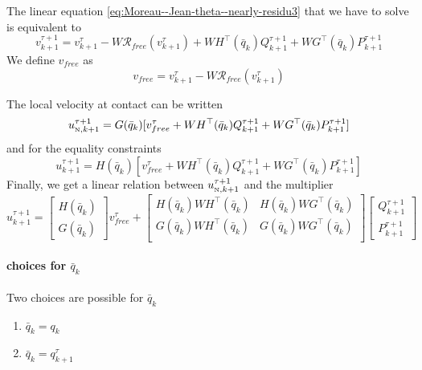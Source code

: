 The linear equation \ref{eq:Moreau--Jean-theta--nearly-residu3} that we have to solve is equivalent to
\begin{equation}
  \label{eq:107}
  \boxed{v^{\tau+1}_{k+1} = v^{\tau}_{k+1} - W  \mathcal R_{free}(v^\tau_{k+1}) + W   H^\top(\bar q_k) Q^{\tau+1}_{k+1} + W G^\top(\bar q_k) P^{\tau+1}_{k+1}}
\end{equation}
We define  $v_{free}$ as
\begin{equation}
  \label{eq:108}
  v_{free}  = v^{\tau}_{k+1} - W  \mathcal R_{free}(v^\tau_{k+1})
\end{equation}

The local velocity at contact can be written
\begin{equation}
  \label{eq:109}
  u^{\tau+1}_{{\hbox{\tiny{N}}},k+1} = G(\bar q_k) [  v_{free}^{\tau} + W   H^\top(\bar q_k) Q^{\tau+1}_{k+1} + W G^\top(\bar q_k) P^{\tau+1}_{k+1}]
\end{equation}
and for the equality constraints
\begin{equation}
  \label{eq:110}
  u^{\tau+1}_{k+1} = H(\bar q_k) [  v_{free}^{\tau} + W   H^\top(\bar q_k) Q^{\tau+1}_{k+1} + W G^\top(\bar q_k) P^{\tau+1}_{k+1}]
\end{equation}
Finally, we get a linear relation between $u^{\tau+1}_{{\hbox{\tiny{N}}},k+1}$ and the multiplier 
\begin{equation}
  \label{eq:111}
 \boxed{ u^{\tau+1}_{k+1} =
  \begin{bmatrix}
    H(\bar q_k) \\
    G(\bar q_k)
  \end{bmatrix} v_{free}^{\tau}
  +
  \begin{bmatrix}
    H(\bar q_k)W   H^\top(\bar q_k) & H(\bar q_k)W   G^\top(\bar q_k) \\
    G(\bar q_k)W   H^\top(\bar q_k) & G(\bar q_k)W   G^\top(\bar q_k) \\
  \end{bmatrix}
  \begin{bmatrix}
    Q^{\tau+1}_{k+1} \\
    P^{\tau+1}_{k+1}
  \end{bmatrix}}
\end{equation}






\paragraph{choices for $\bar q_k$} Two choices are possible for $\bar q_k$
\begin{enumerate}
\item $\bar q_k = q_k$
\item $\bar q_k = q^{\tau}_{k+1}$
\end{enumerate}

